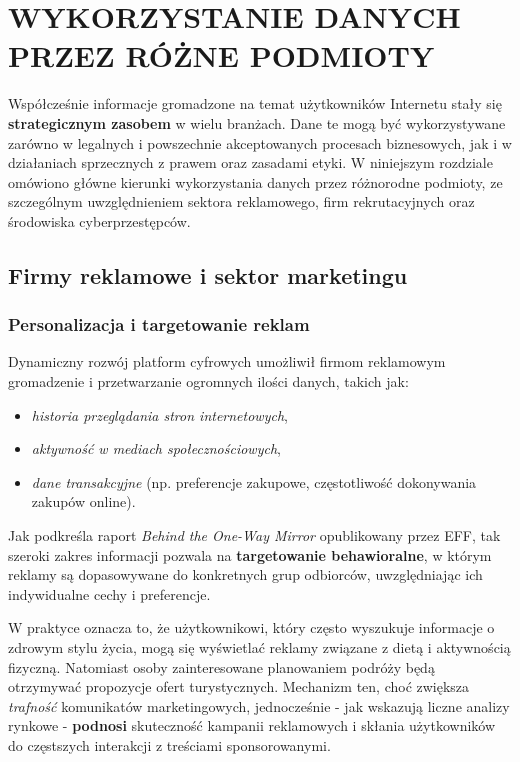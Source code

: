 \chapter{WYKORZYSTANIE DANYCH PRZEZ RÓŻNE PODMIOTY}

\noindent
Współcześnie informacje gromadzone na temat użytkowników Internetu stały się \textbf{strategicznym zasobem} w wielu branżach. Dane te mogą być wykorzystywane zarówno w legalnych i powszechnie akceptowanych procesach biznesowych, jak i w działaniach sprzecznych z prawem oraz zasadami etyki. W niniejszym rozdziale omówiono główne kierunki wykorzystania danych przez różnorodne podmioty, ze szczególnym uwzględnieniem sektora reklamowego, firm rekrutacyjnych oraz środowiska cyberprzestępców.

\vspace{1em}

\section{Firmy reklamowe i sektor marketingu}

\subsection{Personalizacja i targetowanie reklam}
Dynamiczny rozwój platform cyfrowych umożliwił firmom reklamowym gromadzenie i przetwarzanie ogromnych ilości danych, takich jak:
\begin{itemize}
    \item \emph{historia przeglądania stron internetowych},
    \item \emph{aktywność w mediach społecznościowych},
    \item \emph{dane transakcyjne} (np. preferencje zakupowe, częstotliwość dokonywania zakupów online).
\end{itemize}
Jak podkreśla raport \emph{Behind the One-Way Mirror} opublikowany przez EFF\cite{EFF}, tak szeroki zakres informacji pozwala na \textbf{targetowanie behawioralne}, w którym reklamy są dopasowywane do konkretnych grup odbiorców, uwzględniając ich indywidualne cechy i preferencje.

W praktyce oznacza to, że użytkownikowi, który często wyszukuje informacje o zdrowym stylu życia, mogą się wyświetlać reklamy związane z dietą i aktywnością fizyczną. Natomiast osoby zainteresowane planowaniem podróży będą otrzymywać propozycje ofert turystycznych. Mechanizm ten, choć zwiększa \emph{trafność} komunikatów marketingowych, jednocześnie - jak wskazują liczne analizy rynkowe - \textbf{podnosi} skuteczność kampanii reklamowych i skłania użytkowników do częstszych interakcji z treściami sponsorowanymi.

